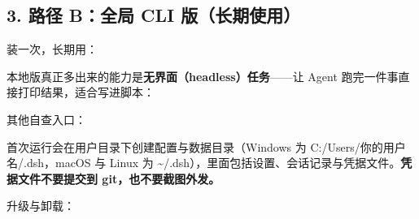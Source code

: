 \subsection{3. 路径 B：全局 CLI
版（长期使用）}\label{ux8defux5f84-bux5168ux5c40-cli-ux7248ux957fux671fux4f7fux7528}

装一次，长期用：

\begin{Shaded}
\begin{Highlighting}[]
                   
\end{Highlighting}
\end{Shaded}

本地版真正多出来的能力是\textbf{无界面（headless）任务}------让 Agent
跑完一件事直接打印结果，适合写进脚本：

\begin{Shaded}
\begin{Highlighting}[]
 
\end{Highlighting}
\end{Shaded}

其他自查入口：

\begin{Shaded}
\begin{Highlighting}[]
                           
                      
                    
\end{Highlighting}
\end{Shaded}

首次运行会在用户目录下创建配置与数据目录（Windows 为
C:/Users/你的用户名/.dsh，macOS 与 Linux 为
\textasciitilde/.dsh），里面包括设置、会话记录与凭据文件。\textbf{凭据文件不要提交到
git，也不要截图外发。}

升级与卸载：

\begin{Shaded}
\begin{Highlighting}[]
\end{Highlighting}
\end{Shaded}

